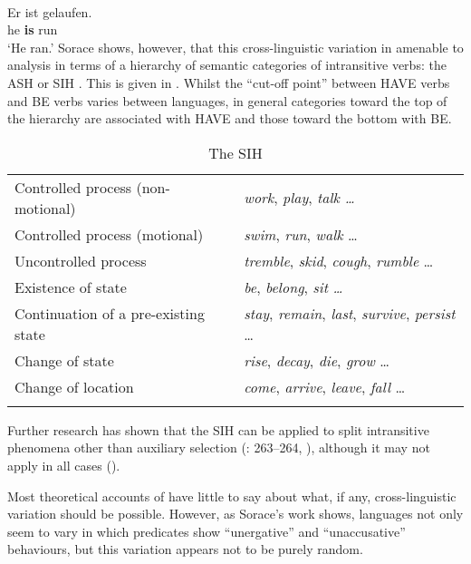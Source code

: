 \documentclass[output=paper]{langsci/langscibook}
\begin{document}
\ea {}\\
    \sn
    \gll Er ist gelaufen.\\
    he \textbf{is} run\\
    \glt \enquote*{He ran.}
\z
Sorace shows, however, that this cross-linguistic variation in amenable to
analysis in terms of a hierarchy of semantic categories of intransitive verbs:
the \gls{ASH} or \gls{SIH} \citep{SoraceShomura2001}.  This is given in
. Whilst the \enquote{cut-off point} between HAVE verbs and
BE verbs varies between languages, in general categories toward the top of the
hierarchy are associated with HAVE and those toward the bottom with BE.

\begin{table}[htb]
\begin{tabularx}{\textwidth}{XX}
\lsptoprule
Controlled process (non-motional) & \emph{work}, \emph{play}, \emph{talk \dots{}}\\
Controlled process (motional) & \emph{swim}, \emph{run}, \emph{walk} \dots{}\\
Uncontrolled process & \emph{tremble}, \emph{skid}, \emph{cough}, \emph{rumble} \dots{}\\
Existence of state & \emph{be}, \emph{belong}, \emph{sit} \emph{\dots{}}\\
Continuation of a pre-existing state & \emph{stay}, \emph{remain}, \emph{last}, \emph{survive}, \emph{persist} \dots{}\\
Change of state & \emph{rise}, \emph{decay}, \emph{die}, \emph{grow} \dots{}\\
Change of location & \emph{come}, \emph{arrive}, \emph{leave}, \emph{fall} \dots{}\\
\lspbottomrule
\end{tabularx}
\caption{The \glsdesc{SIH} \parencite{Sorace2000}}\label{tab:key:19.2}
\end{table}
Further research has shown that the \gls{SIH} can be applied to split intransitive
phenomena other than auxiliary selection (\citealt{Sorace2004}: 263--264,
\citealt{Montrul2005}), although it may not apply in all cases
(\citealt{Baker2013,Baker2018}).

Most theoretical accounts of  have little to say about
what, if any, cross-linguistic variation should be possible. However, as
Sorace’s work shows, languages not only seem to vary in which predicates show
\enquote{unergative} and \enquote{unaccusative} behaviours, but this variation
appears not to be purely random.
\end{document}
